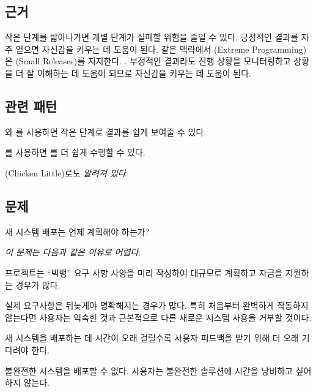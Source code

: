 \documentclass[a4paper,10pt,twoside]{book}
\begin{document}
\subsection*{근거}

작은 단계를 밟아나가면 개별 단계가 실패할 위험을 줄일 수 있다. 긍정적인 결과를 자주 얻으면 자신감을 키우는 데 도움이 된다. 같은 맥락에서 (Extreme Programming)은 (Small Releases)를 지지한다. \cite{Beck00a}. 부정적인 결과라도 진행 상황을 모니터링하고 상황을 더 잘 이해하는 데 도움이 되므로 자신감을 키우는 데 도움이 된다.

\subsection*{관련 패턴}

와 를 사용하면 작은 단계로 결과를 쉽게 보여줄 수 있다. 

를 사용하면 를 더 쉽게 수행할 수 있다. 


(Chicken Little)로도 \emph{알려져 있다}. \cite{Brod95a}


\subsection*{문제}

새 시스템 배포는 언제 계획해야 하는가?

\emph{이 문제는 다음과 같은 이유로 어렵다.}

\begin{bulletlist}
\item 프로젝트는 ``빅뱅'' 요구 사항 사양을 미리 작성하여 대규모로 계획하고 자금을 지원하는 경우가 많다.

\item 실제 요구사항은 뒤늦게야 명확해지는 경우가 많다. 특히 처음부터 완벽하게 작동하지 않는다면 사용자는 익숙한 것과 근본적으로 다른 새로운 시스템 사용을 거부할 것이다.

\item 새 시스템을 배포하는 데 시간이 오래 걸릴수록 사용자 피드백을 받기 위해 더 오래 기다려야 한다.

\item 불완전한 시스템을 배포할 수 없다. 사용자는 불완전한 솔루션에 시간을 낭비하고 싶어하지 않는다.
\end{bulletlist}
\end{document}
